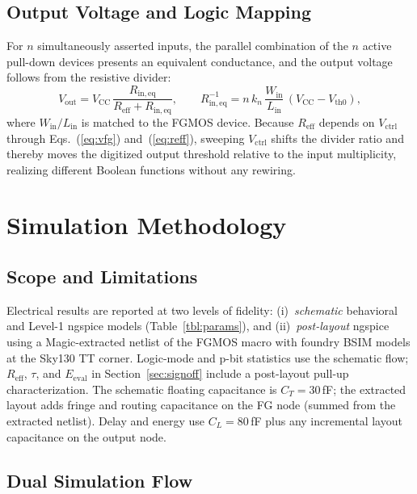 \documentclass[a4paper,fleqn]{cas-sc}
\newcommand{\Vctrl}{V_{\mathrm{ctrl}}}
\newcommand{\Vout}{V_{\mathrm{out}}}
\newcommand{\Vcc}{V_{\mathrm{CC}}}
\newcommand{\Reff}{R_{\mathrm{eff}}}
\newcommand{\Vth}{V_{\mathrm{th0}}}
\newcommand{\kn}{k_{n}}
\newcommand{\CL}{C_{L}}
\newcommand{\CT}{C_{T}}
\newcommand{\Eval}{E_{\mathrm{eval}}}
\begin{document}
\subsection{Output Voltage and Logic Mapping}

For $n$ simultaneously asserted inputs, the parallel combination of the $n$ active
pull-down devices presents an equivalent conductance, and the output voltage follows
from the resistive divider:
%
\begin{equation}
\Vout
  = \Vcc\,\frac{R_{\mathrm{in,eq}}}{\Reff + R_{\mathrm{in,eq}}},
  \qquad
  R_{\mathrm{in,eq}}^{-1}
    = n\,\kn\,\frac{W_{\mathrm{in}}}{L_{\mathrm{in}}}\,(\Vcc - \Vth),
\label{eq:vout}
\end{equation}
%
where $W_{\mathrm{in}}/L_{\mathrm{in}}$ is matched to the FGMOS device. Because
$\Reff$ depends on $\Vctrl$ through Eqs.~(\ref{eq:vfg}) and~(\ref{eq:reff}), sweeping
$\Vctrl$ shifts the divider ratio and thereby moves the digitized output threshold
relative to the input multiplicity, realizing different Boolean functions without any
rewiring.

\section{Simulation Methodology}
\label{sec:methods}

\subsection{Scope and Limitations}

Electrical results are reported at two levels of fidelity: (i)~\emph{schematic}
behavioral and Level-1 ngspice models (Table~\ref{tbl:params}), and
(ii)~\emph{post-layout} ngspice using a Magic-extracted netlist of the FGMOS macro
with foundry BSIM models at the Sky130 TT corner. Logic-mode and p-bit statistics
use the schematic flow; $\Reff$, $\tau$, and $\Eval$ in Section~\ref{sec:signoff}
include a post-layout pull-up characterization. The schematic floating capacitance
is $\CT = 30$\,fF; the extracted layout adds fringe and routing capacitance on the
FG node (summed from the extracted netlist). Delay and energy use $\CL = 80$\,fF
plus any incremental layout capacitance on the output node.

\subsection{Dual Simulation Flow}
\end{document}
